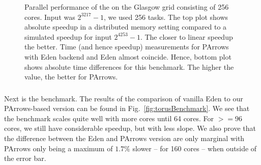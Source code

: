 \begin{figure}
\centering
%
{\label{subfig:rm-dist-a}}%
{\label{subfig:rm-dist-b}}
\caption{Parallel performance of the \jacobitest on the Glasgow grid
  consisting of 256 cores. Input was $2^{3217}-1$, we used 256
  tasks. The top plot shows absolute speedup in a distributed memory setting compared to a simulated speedup for input $2^{4253}-1$. The
  closer to linear speedup the better. Time
  (and hence speedup) measurements for PArrows with Eden backend and
  Eden almost coincide. Hence, bottom plot shows
absolute time differences for this benchmark. The
higher the value, the better for PArrows.}
\label{fig:bench-jacobi-dist}
\end{figure}

\subsubsection{\torustest}

Next is the \torustest benchmark. The results of the comparison of vanilla Eden to our PArrows-based version can be found in Fig.~\ref{fig:torusBenchmark}. We see that the benchmark scales quite well with more cores until 64 cores. For $>=96$ cores, we still have considerable speedup, but with less slope. We also prove that the difference between the Eden and PArrows version are only marginal with PArrows only being a maximum of $1.7\%$ slower -- for 160 cores -- when outside of the error bar.  %

\newcommand{\speedupTorusDist}[3]{
\speedupplot{Speedup of \torustest \enquote{#1}}{PArrows}{256}{#2}{
\addplot [mark=*,very thick,blue] table [scatter, x="nCores", y="speedup", col sep=comma, mark=none,
smooth]{benchmarks/distributed-torus/bench-torus-distributed.bench.torus-matrix-parrows-#1.csv};
}{#3}{\plotwidthDist}
}


\newcommand{\performanceTorusDistDiff}[4]{
\performancediffplot{Run time differences\\for \torustest \enquote{#1}}{(Eden $-$ PArrows)}{256}{#2}{
\addplot+[mark=*,very thick,error bars/.cd,
    y dir=both,y explicit] table [x="nCores", y="time", y error="max stddev", col sep=comma, mark=dots,
smooth]{benchmarks/distributed-torus/#1-diff.csv};
}{#3}{#4}{\plotwidthDist}
}

